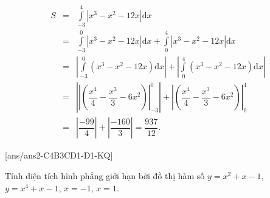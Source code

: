 \begin{ex}
{\begin{itemchoice}
\begin{eqnarray*}
	S&=&\displaystyle\int\limits_{-3}^4\left|x^3-x^2-12x\right| \mathrm{d}x
	\\&=&\displaystyle\int\limits_{-3}^0\left|x^3-x^2-12x\right| \mathrm{d}x+\displaystyle\int\limits_0^4\left|x^3-x^2-12 x\right| \mathrm{d}x 
	\\&=&\left|\displaystyle\int\limits_{-3}^0\left(x^3-x^2-12 x\right) \mathrm{d}x\right|+\left|\displaystyle\int\limits_0^4\left(x^3-x^2-12 x\right) \mathrm{d}x\right|
	\\&=&\left| \left|\left(\dfrac{x^4}{4}-\dfrac{x^3}{3}-6 x^2\right)\right|_{-3}^0\right| +\left| \left(\dfrac{x^4}{4}-\dfrac{x^3}{3}-6 x^2\right)\right|_0^4
	\\&=&\left|\dfrac{-99}{4}\right|+\left|\dfrac{-160}{3}\right|=\dfrac{937}{12}.
\end{eqnarray*}
\end{itemchoice}
}
\end{ex}
{}[ans/ans2-C4B3CD1-D1-KQ]
\begin{ex}%
	Tính diện tích hình phẳng giới hạn bời đồ thị hàm số $y=x^2+x-1$, $y=x^4+x-1$, $x=-1$, $x=1$.
\end{ex}

